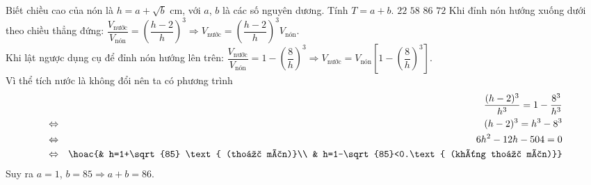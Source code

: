 \begin{ex}
\begin{center}
	\end{center}
	Biết chiều cao của nón là $h=a+\sqrt{b}$ cm, với $a$, $b$ là các số nguyên dương. Tính $T=a+b$.
	\choice
	{$22$}
	{$58$}
	{\True $86$}
	{$72$}
	\loigiai
	{
		Khi đỉnh nón hướng xuống dưới theo chiều thẳng đứng: $\dfrac{V_{\text{nước}}}{V_{\text{nón}}}=\left(\dfrac{h-2}{h}\right)^3\Rightarrow V_{\text{nước}}=\left(\dfrac{h-2}{h}\right)^3V_{\text{nón}}$.\\
		Khi lật ngược dụng cụ để đỉnh nón hướng lên trên: $\dfrac{V_{\text{nước}}}{V_{\text{nón}}}=1-\left(\dfrac{8}{h}\right)^3\Rightarrow V_{\text{nước}}=V_{\text{nón}}\left[1-\left(\dfrac{8}{h}\right)^3\right]$.\\
		Vì thể tích nước là không đổi nên ta có phương trình
		\begin{eqnarray*}
			&&\dfrac{(h-2)^3}{h^3}=1-\dfrac{8^3}{h^3}\\
			&\Leftrightarrow & (h-2)^3=h^3-8^3\\
			&\Leftrightarrow & 6h^2-12h-504=0\\
			&\Leftrightarrow &\hoac{& h=1+\sqrt{85} \text{ (thoả mãn)}\\ & h=1-\sqrt{85}<0.\text{ (không thoả mãn)}}
		\end{eqnarray*}
		Suy ra $a=1$, $b=85\Rightarrow a+b=86$.
	}
\end{ex}

